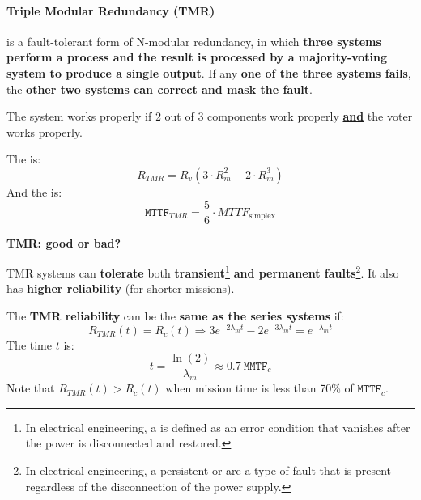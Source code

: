 \newpage

\paragraph{Triple Modular Redundancy (TMR)}

 is a fault-tolerant form of N-modular redundancy, in which \textbf{three systems perform a process and the result is processed by a majority-voting system to produce a single output}. If any \textbf{one of the three systems fails}, the \textbf{other two systems can correct and mask the fault}.

\highspace
The system works properly if 2 out of 3 components work properly \textbf{\underline{and}} the voter works properly.

\highspace
The  is:
\begin{equation}
	R_{TMR} = R_{v}\left(3 \cdot R_{m}^{2} - 2 \cdot R_{m}^{3}\right)
\end{equation}
And the  is:
\begin{equation}
	\texttt{MTTF}_{TMR} = \dfrac{5}{6} \cdot MTTF_{\text{simplex}}
\end{equation}

\begin{flushleft}
	\textcolor{Green3}{ \textbf{TMR: good or bad?}}
\end{flushleft}
TMR systems can \textbf{tolerate} both \textbf{transient}\footnote{In electrical engineering, a  is defined as an error condition that vanishes after the power is disconnected and restored.} \textbf{and permanent faults}\footnote{In electrical engineering, a persistent or  are a type of fault that is present regardless of the disconnection of the power supply.}. It also has \textbf{higher reliability} (for shorter missions).

\highspace
The \textbf{TMR reliability} can be the \textbf{same as the series systems} if:
\begin{equation}
	R_{TMR}\left(t\right) = R_{c}\left(t\right) \Longrightarrow 3e^{-2 \lambda_{m} t} - 2e^{-3 \lambda_{m} t} = e^{-\lambda_{m} t}
\end{equation}
The time $t$ is:
\begin{equation}
	t = \dfrac{\ln\left(2\right)}{\lambda_{m}} \approx 0.7 \: \texttt{MMTF}_{c}
\end{equation}
Note that $R_{TMR}\left(t\right) > R_{c}\left(t\right)$ when mission time is less than 70\% of $\texttt{MTTF}_{c}$.

